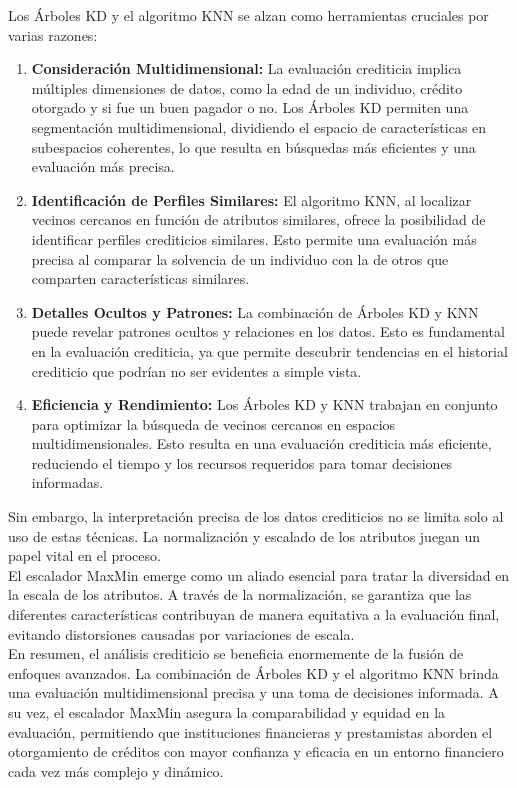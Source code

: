 \documentclass{article}
\begin{document}
\begin{sloppypar}
Los Árboles KD y el algoritmo KNN se alzan como herramientas cruciales por varias razones:
\begin{enumerate}
    \item \textbf{Consideración Multidimensional:} La evaluación crediticia implica múltiples dimensiones de datos, como la edad de un individuo, crédito otorgado y si fue un buen pagador o no. Los Árboles KD permiten una segmentación multidimensional, dividiendo el espacio de características en subespacios coherentes, lo que resulta en búsquedas más eficientes y una evaluación más precisa. 
    \item \textbf{Identificación de Perfiles Similares: }El algoritmo KNN, al localizar vecinos cercanos en función de atributos similares, ofrece la posibilidad de identificar perfiles crediticios similares. Esto permite una evaluación más precisa al comparar la solvencia de un individuo con la de otros que comparten características similares.
    \item \textbf{Detalles Ocultos y Patrones:} La combinación de Árboles KD y KNN puede revelar patrones ocultos y relaciones en los datos. Esto es fundamental en la evaluación crediticia, ya que permite descubrir tendencias en el historial crediticio que podrían no ser evidentes a simple vista.
    \item \textbf{Eficiencia y Rendimiento: }Los Árboles KD y KNN trabajan en conjunto para optimizar la búsqueda de vecinos cercanos en espacios multidimensionales. Esto resulta en una evaluación crediticia más eficiente, reduciendo el tiempo y los recursos requeridos para tomar decisiones informadas.
\end{enumerate}

Sin embargo, la interpretación precisa de los datos crediticios no se limita solo al uso de estas técnicas. La normalización y escalado de los atributos juegan un papel vital en el proceso. \\
El escalador MaxMin emerge como un aliado esencial para tratar la diversidad en la escala de los atributos. A través de la normalización, se garantiza que las diferentes características contribuyan de manera equitativa a la evaluación final, evitando distorsiones causadas por variaciones de escala.\\

En resumen, el análisis crediticio se beneficia enormemente de la fusión de enfoques avanzados. La combinación de Árboles KD y el algoritmo KNN brinda una evaluación multidimensional precisa y una toma de decisiones informada. A su vez, el escalador MaxMin asegura la comparabilidad y equidad en la evaluación, permitiendo que instituciones financieras y prestamistas aborden el otorgamiento de créditos con mayor confianza y eficacia en un entorno financiero cada vez más complejo y dinámico.
\clearpage


\end{sloppypar}
\end{document}
